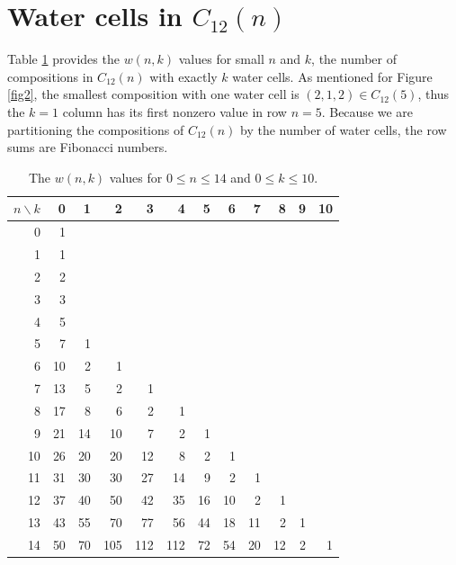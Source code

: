 \documentclass[]{interact}
\theoremstyle{plain}
\numberwithin{equation}{section} %
\numberwithin{table}{section} %
\numberwithin{figure}{section}
\begin{document}
\section{Water cells in $C_{12}(n)$}


Table \ref{wtab} provides the $w(n,k)$ values for small $n$ and $k$, the number of compositions in $C_{12}(n)$ with exactly $k$ water cells.  As mentioned for Figure \ref{fig2}, the smallest composition with one water cell is $(2,1,2) \in C_{12}(5)$, thus the $k = 1$ column has its first nonzero value in row $n = 5$.  Because we are partitioning the compositions of $C_{12}(n)$ by the number of water cells, the row sums are Fibonacci numbers.

\begin{table}[ht]
\caption{The $w(n,k)$ values for $0 \le n \le 14$ and $0 \le k \le 10$.} 
\medskip
\begin{center}
\renewcommand{\arraystretch}{1.3}
\begin{tabular}{r|rrrrrrrrrrr}
$n \backslash k$ & 0 & 1 & 2 & 3 & 4 & 5 & 6 & 7 & 8 & 9 & 10 \\ \hline
0 & 1 \\
1 & 1 \\
2 & 2 \\
3 & 3 \\
4 & 5 \\
5 & 7   &   1 \\
6 & 10  &  2    & 1 \\
7 & 13  &  5    & 2    & 1 \\
8 & 17  &   8   &  6   & 2   & 1 \\
9 & 21  & 14   & 10  & 7   & 2   & 1 \\
10 & 26  & 20   & 20  & 12 & 8   & 2 &  1 \\
11 & 31  & 30   & 30  & 27 & 14  & 9 &  2 &  1  \\
12 & 37  & 40   & 50  & 42 &  35 & 16 & 10 & 2  & 1 & \phantom{10} \\
13 & 43  & 55   & 70  & 77 &  56 & 44 & 18 & 11 & 2 &   1 \\
14 & 50  & 70   & 105 & 112 & 112 &  72 & 54 & 20 & 12 & 2 & 1
\end{tabular}
\end{center}
\label{wtab}
\end{table}
\end{document}
